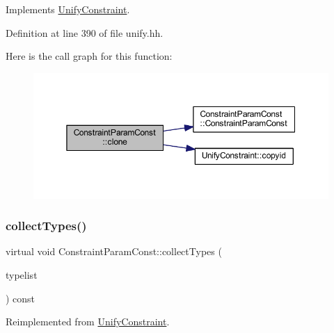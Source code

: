 Implements \mbox{\hyperlink{class_unify_constraint_a4f068343932637d355644bb21559aa12}{Unify\+Constraint}}.



Definition at line 390 of file unify.\+hh.

Here is the call graph for this function\+:
\nopagebreak
\begin{figure}[H]
\begin{center}
\leavevmode
\includegraphics[width=350pt]{class_constraint_param_const_abcdd802e7100afb44698c156aec6e3a5_cgraph}
\end{center}
\end{figure}
\mbox{\label{class_constraint_param_const_aaa63c83416d8aff7d7984c6ba4864763}} 
\subsubsection{\texorpdfstring{collectTypes()}{collectTypes()}}
{\footnotesize\ttfamily virtual void Constraint\+Param\+Const\+::collect\+Types (\begin{DoxyParamCaption}\item[{vector$<$ \mbox{\hyperlink{class_unify_datatype}{Unify\+Datatype}} $>$ \&}]{typelist }\end{DoxyParamCaption}) const\hspace{0.3cm}{\ttfamily [virtual]}}



Reimplemented from \mbox{\hyperlink{class_unify_constraint_acb83b6bea3b21e13054e72ac9cfaba0f}{Unify\+Constraint}}.

\mbox{\label{class_constraint_param_const_a6e000a8f053ad75f91b94483cedbf814}} 
